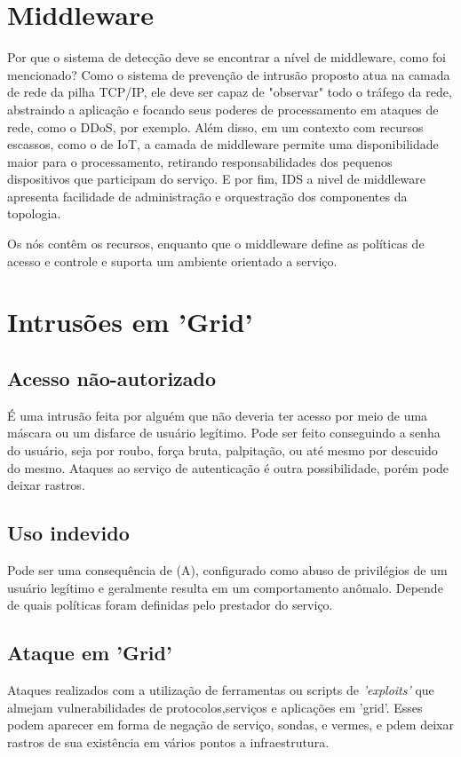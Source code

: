\documentclass[journal]{IEEEtran}
\begin{document}
\section{Middleware}
Por que o sistema de detecção deve se encontrar a nível de middleware, como foi mencionado? Como o sistema de prevenção de intrusão proposto atua na camada de rede da pilha TCP/IP, ele deve ser capaz de "observar" todo o tráfego da rede, abstraindo a aplicação e focando seus poderes de processamento em ataques de rede, como o DDoS, por exemplo. Além disso, em um contexto com recursos escassos, como o de IoT, a camada de middleware permite uma disponibilidade maior para o processamento, retirando responsabilidades dos pequenos dispositivos que participam do serviço. E por fim, IDS a nivel de middleware apresenta facilidade de administração e orquestração dos componentes da topologia. \par
Os nós contêm os recursos, enquanto que o middleware define as políticas de acesso e controle e suporta um ambiente orientado a serviço. \par


\section{Intrusões em 'Grid'}
\subsection{Acesso não-autorizado}
É uma intrusão feita por alguém que não deveria ter acesso por meio de uma máscara ou um disfarce de usuário legítimo. Pode ser feito conseguindo a senha do usuário, seja por roubo, força bruta, palpitação, ou até mesmo por descuido do mesmo. Ataques ao serviço de autenticação é outra possibilidade, porém pode deixar rastros.
\subsection{Uso indevido}
Pode ser uma consequência de (A), configurado como abuso de privilégios de um usuário legítimo e geralmente resulta em um comportamento anômalo. Depende de quais políticas foram definidas pelo prestador do serviço.
\subsection{Ataque em 'Grid'}
Ataques realizados com a utilização de ferramentas ou scripts de \textit{'exploits'} que almejam vulnerabilidades de protocolos,serviços e aplicações em 'grid'. Esses podem aparecer em forma de negação de serviço, sondas, e vermes, e pdem deixar rastros de sua existência em vários pontos a infraestrutura.
\end{document}
